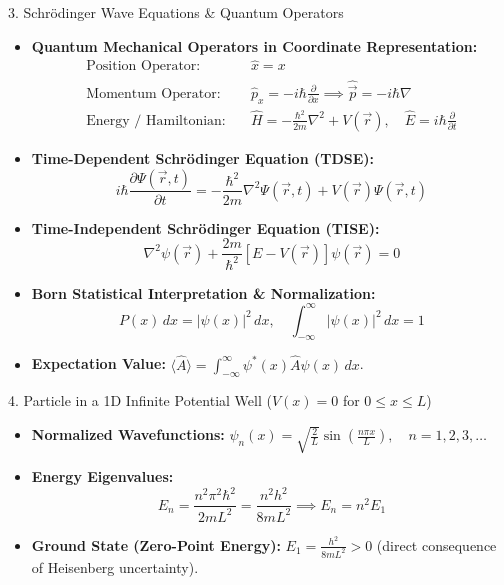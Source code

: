 \begin{formulabox}{3. Schr\"odinger Wave Equations \& Quantum Operators}
\begin{itemize}[leftmargin=*,itemsep=2pt]
    \item \textbf{Quantum Mechanical Operators in Coordinate Representation:}
    \begin{align*}
    \text{Position Operator:} \quad & \hat{x} = x \\
    \text{Momentum Operator:} \quad & \hat{p}_x = -i\hbar\frac{\partial}{\partial x} \implies \hat{\vec{p}} = -i\hbar\nabla \\
    \text{Energy / Hamiltonian:} \quad & \hat{H} = -\frac{\hbar^2}{2m}\nabla^2 + V(\vec{r}), \quad \hat{E} = i\hbar\frac{\partial}{\partial t}
    \end{align*}
    \item \textbf{Time-Dependent Schr\"odinger Equation (TDSE):}
    \[
    i\hbar\frac{\partial \Psi(\vec{r},t)}{\partial t} = -\frac{\hbar^2}{2m}\nabla^2 \Psi(\vec{r},t) + V(\vec{r})\Psi(\vec{r},t)
    \]
    \item \textbf{Time-Independent Schr\"odinger Equation (TISE):}
    \[
    \nabla^2 \psi(\vec{r}) + \frac{2m}{\hbar^2}\left[ E - V(\vec{r}) \right]\psi(\vec{r}) = 0
    \]
    \item \textbf{Born Statistical Interpretation \& Normalization:}
    \[
    P(x)\,dx = |\psi(x)|^2\,dx, \quad \int_{-\infty}^{\infty} |\psi(x)|^2\,dx = 1
    \]
    \item \textbf{Expectation Value:} $\langle \hat{A} \rangle = \int_{-\infty}^{\infty} \psi^*(x) \hat{A} \psi(x)\,dx$.
\end{itemize}
\end{formulabox}

\begin{formulabox}{4. Particle in a 1D Infinite Potential Well ($V(x)=0$ for $0 \le x \le L$)}
\begin{itemize}[leftmargin=*,itemsep=2pt]
    \item \textbf{Normalized Wavefunctions:} $\psi_n(x) = \sqrt{\frac{2}{L}}\sin\left(\frac{n\pi x}{L}\right), \quad n = 1, 2, 3, \dots$
    \item \textbf{Energy Eigenvalues:}
    \[
    E_n = \frac{n^2 \pi^2 \hbar^2}{2m L^2} = \frac{n^2 h^2}{8m L^2} \implies E_n = n^2 E_1
    \]
    \item \textbf{Ground State (Zero-Point Energy):} $E_1 = \frac{h^2}{8m L^2} > 0$ (direct consequence of Heisenberg uncertainty).
\end{itemize}
\end{formulabox}
